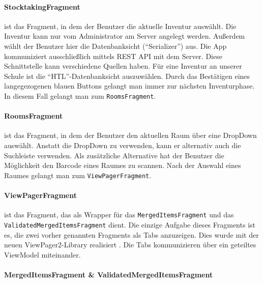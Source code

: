 \hypertarget{stocktakingfragment}{%
\paragraph{StocktakingFragment}\label{stocktakingfragment}}

ist das Fragment, in dem der Benutzer die aktuelle Inventur auswählt.
Die Inventur kann nur vom Administrator am Server angelegt werden.
Außerdem wählt der Benutzer hier die Datenbanksicht (``Serializer'')
aus. Die App kommuniziert ausschließlich mittels REST API mit dem
Server. Diese Schnittstelle kann verschiedene Quellen haben. Für eine
Inventur an unserer Schule ist die ``HTL''-Datenbanksicht auszuwählen.
Durch das Bestätigen eines langegezogenen blauen Buttons gelangt man
immer zur nächsten Inventurphase. In diesem Fall gelangt man zum
\texttt{RoomsFragment}.

\hypertarget{roomsfragment}{%
\paragraph{RoomsFragment}\label{roomsfragment}}

ist das Fragment, in dem der Benutzer den aktuellen Raum über eine
DropDown auswählt. Anstatt die DropDown zu verwenden, kann er alternativ
auch die Suchleiste verwenden. Als zusätzliche Alternative hat der
Benutzer die Möglichkeit den Barcode eines Raumes zu scannen. Nach der
Auswahl eines Raumes gelangt man zum \texttt{ViewPagerFragment}.

\hypertarget{viewpagerfragment}{%
\paragraph{ViewPagerFragment}\label{viewpagerfragment}}

ist das Fragment, das als Wrapper für das \texttt{MergedItemsFragment}
und das \texttt{ValidatedMergedItemsFragment} dient. Die einzige Aufgabe
dieses Fragments ist es, die zwei vorher genannten Fragments als Tabs
anzuzeigen. Dies wurde mit der neuen ViewPager2-Library realisiert
\cite{viewpager2}. Die Tabs kommunizieren über ein geteiltes ViewModel
miteinander.

\hypertarget{mergeditemsfragment-validatedmergeditemsfragment}{%
\paragraph{MergedItemsFragment \&
ValidatedMergedItemsFragment}\label{mergeditemsfragment-validatedmergeditemsfragment}}

